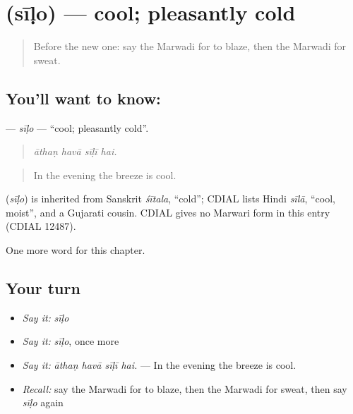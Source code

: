 \section[\texorpdfstring{\mw{सीळो} (sīḷo)}{सीळो (sīḷo)}]{ (sīḷo) — cool; pleasantly cold}

\label{lesson:MW-C228-silo}



\begin{quote}
Before the new one: say the Marwadi for to blaze, then the Marwadi for sweat.
\end{quote}

\subsection*{You'll want to know: }
\textbf{} — \emph{sīḷo} — \textquotedblleft{}cool; pleasantly cold\textquotedblright{}.

\begin{quote}
   
\end{quote}

\begin{quote}
\emph{āthaṇ havā sīḷī hai.}
\end{quote}

\begin{quote}
In the evening the breeze is cool.
\end{quote}

\begin{cousinweb}
\textbf{} (\emph{sīḷo}) is inherited from Sanskrit \emph{śītala}, \textquotedblleft{}cold\textquotedblright{}; CDIAL lists Hindi \emph{sīlā}, \textquotedblleft{}cool, moist\textquotedblright{}, and a Gujarati cousin. CDIAL gives no Marwari form in this entry (CDIAL 12487).
\end{cousinweb}

\begin{grammarlens}[title={What you've built}]
One more word for this chapter.
\end{grammarlens}

\subsection*{Your turn}
\begin{itemize}
\raggedright
  \item \emph{Say it:} \emph{sīḷo}
  \item \emph{Say it:} \emph{sīḷo}, once more
  \item \emph{Say it:} \emph{āthaṇ havā sīḷī hai.} — In the evening the breeze is cool.
  \item \emph{Recall:} say the Marwadi for to blaze, then the Marwadi for sweat, then say \emph{sīḷo} again
\end{itemize}

